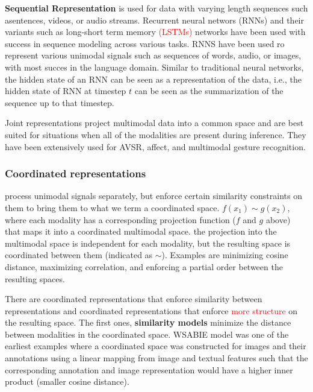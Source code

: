\textbf{Sequential Representation} is used for data with varying length sequences such asentences, videos, or audio streams. Recurrent neural networs (RNNs) and their variants such as long-short term memory \textcolor{red}{(LSTMs)} networks have been used with success in sequence modeling across various tasks. RNNS have been used ro represent various unimodal signals such as sequences of words, audio, or images, with most succes in the language domain. Similar to traditional neural networks, the hidden state of an RNN can be seen as a representation of the data, i.e., the hidden state of RNN at timestep $t$
can be seen as the summarization of the sequence up to that timestep.

Joint representations project multimodal data into a common space and are best suited for situations when all of the modalities are present during inference. They have been extensively used for AVSR, affect, and multimodal gesture recognition.
 
\subsubsection{Coordinated representations} process unimodal signals separately, but enforce certain similarity constraints on them to bring them to what we term a coordinated space.
$f(x_1) \sim g(x_2)$,
where each modality has a corresponding projection function ($f$ and $g$ above) that maps it into a coordinated multimodal space.
the projection into the multimodal space is independent for each modality, but the resulting space is coordinated between them (indicated as $\sim$). Examples are minimizing cosine distance, maximizing correlation, and enforcing a partial order between the resulting spaces.

There are coordinated representations that enforce similarity between representations and coordinated representations that enforce \textcolor{red}{more structure} on the resulting space. The first ones, \textbf{similarity models} minimize the distance between modalities in the coordinated space. WSABIE model was one of the earliest examples where a coordinated space was constructed for images and their annotations using a linear mapping from image and textual features such that the corresponding annotation and image representation would have a higher inner product (smaller cosine distance).


